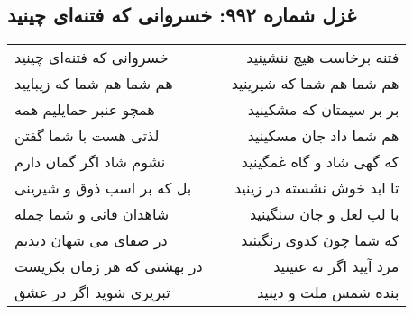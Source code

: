 \begin{center}
\section*{غزل شماره ۹۹۲: خسروانی که فتنه‌ای چینید}
\label{sec:0992}
\begin{longtable}{l p{0.5cm} r}
خسروانی که فتنه‌ای چینید
&&
فتنه برخاست هیچ ننشینید
\\
هم شما هم شما که زیبایید
&&
هم شما هم شما که شیرینید
\\
همچو عنبر حمایلیم همه
&&
بر بر سیمتان که مشکینید
\\
لذتی هست با شما گفتن
&&
هم شما داد جان مسکینید
\\
نشوم شاد اگر گمان دارم
&&
که گهی شاد و گاه غمگینید
\\
بل که بر اسب ذوق و شیرینی
&&
تا ابد خوش نشسته در زینید
\\
شاهدان فانی و شما جمله
&&
با لب لعل و جان سنگینید
\\
در صفای می شهان دیدیم
&&
که شما چون کدوی رنگینید
\\
در بهشتی که هر زمان بکریست
&&
مرد آیید اگر نه عنینید
\\
تبریزی شوید اگر در عشق
&&
بنده شمس ملت و دینید
\\
\end{longtable}
\end{center}
